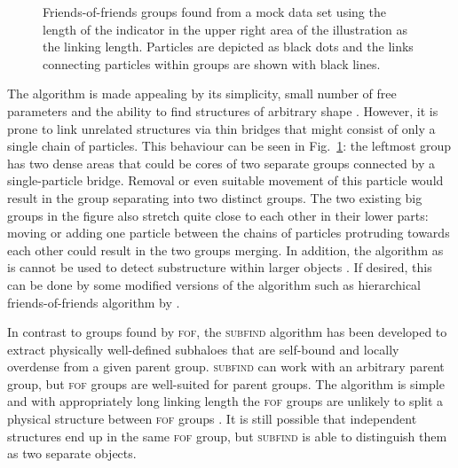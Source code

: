 \documentclass[english, oneside]{HYgradu}
\begin{document}
\begin{figure}
    \centering
    
    \caption{Friends-of-friends groups found from a mock data set using the length of the indicator in the upper right area of the illustration as the linking length. Particles are depicted as black dots and the links connecting particles within groups are shown with black lines.}\label{fig:fof}
\end{figure}

The algorithm is made appealing by its simplicity, small number of free parameters and the ability to find structures of arbitrary shape \citep{davis1985evolution}. However, it is prone to link unrelated structures via thin bridges that might consist of only a single chain of particles. This behaviour can be seen in Fig.\ \ref{fig:fof}: the leftmost group has two dense areas that could be cores of two separate groups connected by a single-particle bridge. Removal or even suitable movement of this particle would result in the group separating into two distinct groups. The two existing big groups in the figure also stretch quite close to each other in their lower parts: moving or adding one particle between the chains of particles protruding towards each other could result in the two groups merging. In addition, the algorithm as is cannot be used to detect substructure within larger objects \citep{springel2001populating}. If desired, this can be done by some modified versions of the algorithm such as hierarchical friends-of-friends algorithm by \citet{Gottlober1999halo}.

In contrast to groups found by \textsc{fof}, the \textsc{subfind} algorithm has been developed to extract physically well-defined subhaloes that are self-bound and locally overdense from a given parent group. \textsc{subfind} can work with an arbitrary parent group, but \textsc{fof} groups are well-suited for parent groups. The algorithm is simple and with appropriately long linking length the \textsc{fof} groups are unlikely to split a physical structure between \textsc{fof} groups \citep{springel2001populating}. It is still possible that independent structures end up in the same \textsc{fof} group, but \textsc{subfind} is able to distinguish them as two separate objects.
\end{document}

